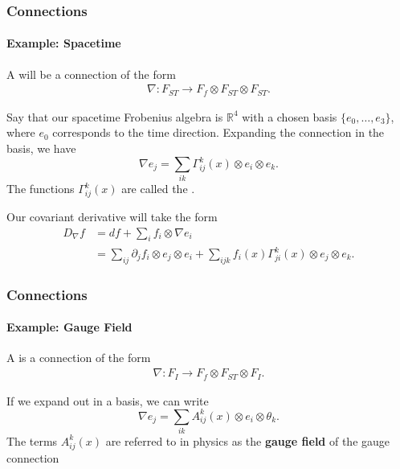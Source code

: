 \documentclass{beamer}
\begin{document}
\begin{frame}


\frametitle{Connections}

\framesubtitle{Example: Spacetime}

A  will be a connection of the form
\begin{align*}
\nabla: F_{ST} \to F_f \otimes F_{ST} \otimes F_{ST}.
\end{align*}

Say that our spacetime Frobenius algebra is $\mathbb{R}^4$ with a chosen basis $\{ e_0, \ldots, e_3 \}$, where $e_0$ corresponds to the time direction. Expanding the connection in the basis, we have
\begin{equation}
\nabla e_j = \sum_{ik} \Gamma_{ij}^k(x) \otimes e_i \otimes e_k.
\end{equation}
The functions $\Gamma_{ij}^k(x)$ are called the .


 Our covariant derivative will take the form
\begin{align*}
D_\nabla f &= df + \sum_i f_i \otimes \nabla e_i \\
&= \sum_{ij} \partial_j f_i \otimes e_j \otimes e_i + \sum_{ijk} f_i(x) \Gamma_{ji}^k (x) \otimes e_j \otimes e_k.
\end{align*}

\end{frame}





\begin{frame}


\frametitle{Connections}

\framesubtitle{Example: Gauge Field}

A  is a connection of the form
\begin{align*}
\nabla: F_{I} \to F_f \otimes F_{ST} \otimes F_{I}.
\end{align*}


 If we expand out in a basis, we can write
\begin{equation}
\nabla e_j = \sum_{ik} A_{ij}^k(x) \otimes e_i \otimes \theta_k.
\end{equation}
The terms $A_{ij}^k(x)$ are referred to in physics as the \textbf{gauge field} of the gauge connection



\end{frame}
\end{document}
